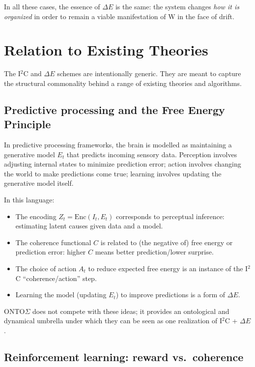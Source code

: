 \documentclass[12pt,a4paper]{report}
\newcommand{\Will}{W}
\begin{document}
In all these cases, the essence of \(\Delta E\) is the same: the system changes \emph{how it is organized} in order to remain a viable manifestation of \Will{} in the face of drift.

\section{Relation to Existing Theories}

The I$^2$C and $\Delta E$ schemes are intentionally generic. They are meant to capture the structural commonality behind a range of existing theories and algorithms.

\subsection*{Predictive processing and the Free Energy Principle}

In predictive processing frameworks, the brain is modelled as maintaining a generative model \(E_t\) that predicts incoming sensory data. Perception involves adjusting internal states to minimize prediction error; action involves changing the world to make predictions come true; learning involves updating the generative model itself.

In this language:

\begin{itemize}[leftmargin=2em]
    \item The encoding \(Z_t = \mathrm{Enc}(I_t, E_t)\) corresponds to perceptual inference: estimating latent causes given data and a model.
    \item The coherence functional \(C\) is related to (the negative of) free energy or prediction error: higher \(C\) means better prediction/lower surprise.
    \item The choice of action \(A_t\) to reduce expected free energy is an instance of the I$^2$C ``coherence/action'' step.
    \item Learning the model (updating \(E_t\)) to improve predictions is a form of $\Delta E$.
\end{itemize}

ONTO$\Sigma$ does not compete with these ideas; it provides an ontological and dynamical umbrella under which they can be seen as one realization of I$^2$C + $\Delta E$.

\subsection*{Reinforcement learning: reward vs.\ coherence}
\end{document}
